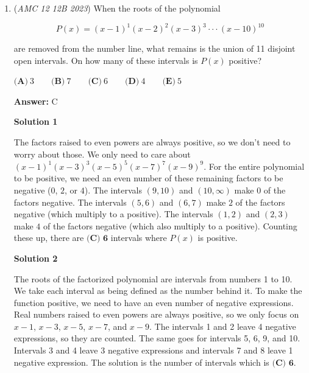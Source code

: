 \begin{enumerate}
\textbf{Solution 5 (Logic)}

We realize that every $2 \times 1$ rectangle must contain an edge and no more than one edge. There are a total of four edges so the answer is $\boxed{\text{(C) }   4.}$.~darrenn.cp

 



\textbf{Solution 6 (Very Fast)}

Draw the 3x3 grid. We want to minimize our options, so we look at the square shared by the most 2x1 rectangles. This is the center square. So, to guarantee our success, we choose the four edges from the center square, so our answer is $\boxed{C.4}$



	\item (\textit{AMC 12 12B 2023}) When the roots of the polynomial


 
 \[P(x)  = (x-1)^1 (x-2)^2 (x-3)^3 \cdot \cdot \cdot (x-10)^{10}\]


 are removed from the number line, what remains is the union of 11 disjoint open intervals. On how many of these intervals is $P(x)$ positive?


 $\textbf{(A)}~3\qquad\textbf{(B)}~7\qquad\textbf{(C)}~6\qquad\textbf{(D)}~4\qquad\textbf{(E)}~5$

 \textbf{Answer: }C



\textbf{Solution 1}

The factors raised to even powers are always positive, so we don't need to worry about those. We only need to care about $(x-1)^1(x-3)^3(x-5)^5(x-7)^7(x-9)^9$. For the entire polynomial to be positive, we need an even number of these remaining factors to be negative ($0$, $2$, or $4$). The intervals $(9, 10)$ and $(10, \infty)$ make $0$ of the factors negative. The intervals $(5, 6)$ and $(6, 7)$ make $2$ of the factors negative (which multiply to a positive). The intervals $(1, 2)$ and $(2, 3)$ make $4$ of the factors negative (which also multiply to a positive). Counting these up, there are $\boxed{\textbf{(C) 6}}$ intervals where $P(x)$ is positive.

 



\textbf{Solution 2}

The roots of the factorized polynomial are intervals from numbers 1 to 10. We take each interval as being defined as the number behind it. To make the function positive, we need to have an even number of negative expressions. Real numbers raised to even powers are always positive, so we only focus on $x-1$, $x-3$, $x-5$, $x-7$, and $x-9$. The intervals 1 and 2 leave 4 negative expressions, so they are counted. The same goes for intervals 5, 6, 9, and 10. Intervals 3 and 4 leave 3 negative expressions and intervals 7 and 8 leave 1 negative expression. The solution is the number of intervals which is $\boxed{\textbf{(C) 6}}$.


\end{enumerate}
